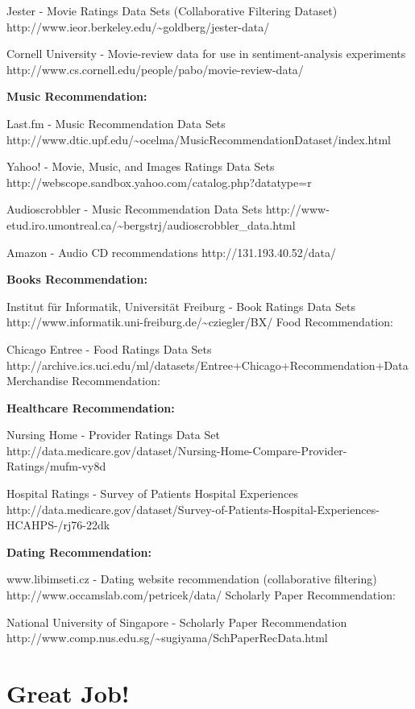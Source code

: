 \documentclass[11pt]{article}
\begin{document}
Jester - Movie Ratings Data Sets (Collaborative Filtering Dataset)
http://www.ieor.berkeley.edu/\textasciitilde{}goldberg/jester-data/

Cornell University - Movie-review data for use in sentiment-analysis
experiments http://www.cs.cornell.edu/people/pabo/movie-review-data/

\textbf{Music Recommendation:}

Last.fm - Music Recommendation Data Sets
http://www.dtic.upf.edu/\textasciitilde{}ocelma/MusicRecommendationDataset/index.html

Yahoo! - Movie, Music, and Images Ratings Data Sets
http://webscope.sandbox.yahoo.com/catalog.php?datatype=r

Audioscrobbler - Music Recommendation Data Sets
http://www-etud.iro.umontreal.ca/\textasciitilde{}bergstrj/audioscrobbler\_data.html

Amazon - Audio CD recommendations http://131.193.40.52/data/

\textbf{Books Recommendation:}

Institut für Informatik, Universität Freiburg - Book Ratings Data Sets
http://www.informatik.uni-freiburg.de/\textasciitilde{}cziegler/BX/ Food
Recommendation:

Chicago Entree - Food Ratings Data Sets
http://archive.ics.uci.edu/ml/datasets/Entree+Chicago+Recommendation+Data
Merchandise Recommendation:

\textbf{Healthcare Recommendation:}

Nursing Home - Provider Ratings Data Set
http://data.medicare.gov/dataset/Nursing-Home-Compare-Provider-Ratings/mufm-vy8d

Hospital Ratings - Survey of Patients Hospital Experiences
http://data.medicare.gov/dataset/Survey-of-Patients-Hospital-Experiences-HCAHPS-/rj76-22dk

\textbf{Dating Recommendation:}

www.libimseti.cz - Dating website recommendation (collaborative
filtering) http://www.occamslab.com/petricek/data/ Scholarly Paper
Recommendation:

National University of Singapore - Scholarly Paper Recommendation
http://www.comp.nus.edu.sg/\textasciitilde{}sugiyama/SchPaperRecData.html

\hypertarget{great-job}{%
\section{Great Job!}\label{great-job}}


    
    
    
    
\end{document}
